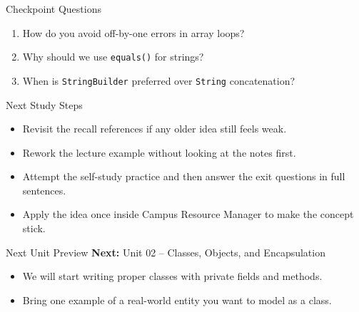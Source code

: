 \documentclass{beamer}
\begin{document}
\begin{frame}{Checkpoint Questions}
  \begin{enumerate}[<+->]
    \item How do you avoid off-by-one errors in array loops?
    \item Why should we use \texttt{equals()} for strings?
    \item When is \texttt{StringBuilder} preferred over \texttt{String} concatenation?
  \end{enumerate}
  \slidesources{\OOPSUnitISources}
\end{frame}

\begin{frame}{Next Study Steps}
\begin{itemize}[<+->]
  \item Revisit the recall references if any older idea still feels weak.
  \item Rework the lecture example without looking at the notes first.
  \item Attempt the self-study practice and then answer the exit questions in full sentences.
  \item Apply the idea once inside Campus Resource Manager to make the concept stick.
\end{itemize}
  \slidesources{\OOPSUnitISources}
\end{frame}

\begin{frame}{Next Unit Preview}
  \textbf{Next:} Unit 02 -- Classes, Objects, and Encapsulation
  \vspace{0.6em}
  \begin{itemize}[<+->]
    \item We will start writing proper classes with private fields and methods.
    \item Bring one example of a real-world entity you want to model as a class.
  \end{itemize}
  \slidesources{\OOPSUnitISources}
\end{frame}
\end{document}
